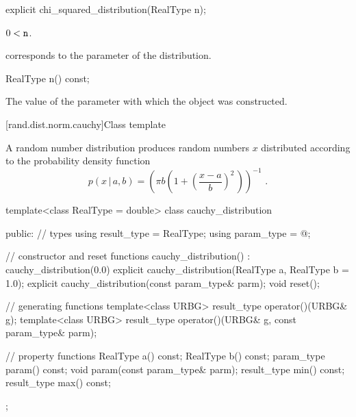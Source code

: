%
\begin{itemdecl}
explicit chi_squared_distribution(RealType n);
\end{itemdecl}

\begin{itemdescr}
\pnum
\expects
$0 < \texttt{n}$.

\pnum
\remarks
{} corresponds to the parameter of the distribution.
\end{itemdescr}

%
\begin{itemdecl}
RealType n() const;
\end{itemdecl}

\begin{itemdescr}
\pnum
\returns
The value of the  parameter
 with which the object was constructed.
\end{itemdescr}


[rand.dist.norm.cauchy]{Class template }%
%
%

\pnum
A  random number distribution
produces random numbers $x$
distributed according to
the probability density function%
%
%
\[  p(x\,|\,a,b) = \left(\pi b \left(1 + \left(\frac{x-a}{b} \right)^2 \, \right)\right)^{-1} \text{ .} \]

%
%
\begin{codeblock}
template<class RealType = double>
  class cauchy_distribution {
  public:
    // types
    using result_type = RealType;
    using param_type  = @\unspec@;

    // constructor and reset functions
    cauchy_distribution() : cauchy_distribution(0.0) {}
    explicit cauchy_distribution(RealType a, RealType b = 1.0);
    explicit cauchy_distribution(const param_type& parm);
    void reset();

    // generating functions
    template<class URBG>
      result_type operator()(URBG& g);
    template<class URBG>
      result_type operator()(URBG& g, const param_type& parm);

    // property functions
    RealType a() const;
    RealType b() const;
    param_type param() const;
    void param(const param_type& parm);
    result_type min() const;
    result_type max() const;
  };
\end{codeblock}


